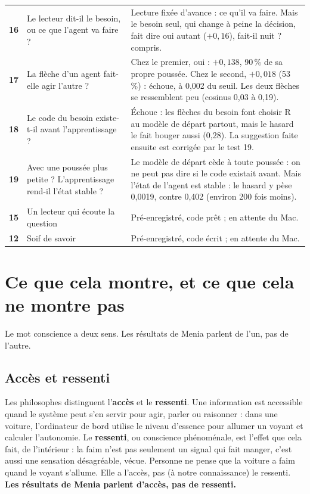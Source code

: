 \documentclass[fontsize=10pt,paper=a4,parskip=half-]{scrartcl}
\newcommand{\lead}[1]{{\fontsize{12}{16.5}\selectfont\color{ink!85!black}#1\par}\vspace{0.3em}}
\newcommand{\q}[1]{\og #1\fg{}}
\newcommand{\pc}{\,\%}
\begin{document}
\begin{center}
\begin{tabularx}{\linewidth}{>{\sffamily\bfseries\color{accent}}c >{\raggedright\arraybackslash}p{4.6cm} >{\raggedright\arraybackslash}X}
16 & Le lecteur dit-il le besoin, ou ce que l'agent va faire ? & Lecture fixée d'avance : \q{ce qu'il va faire}. Mais le besoin seul, qui change à peine la décision, fait dire \q{oui} autant ($+0,16$), \q{fait-il nuit ?} compris.\\
17 & La flèche d'un agent fait-elle agir l'autre ? & Chez le premier, oui : $+0,138$, 90\pc{} de sa propre poussée. Chez le second, $+0,018$ (53\pc) : échoue, à 0,002 du seuil. Les deux flèches se ressemblent peu (cosinus 0,03 à 0,19).\\
18 & Le code du besoin existe-t-il avant l'apprentissage ? & Échoue : les flèches du besoin font choisir R au modèle de départ partout, mais le hasard le fait bouger aussi (0,28). La suggestion faite ensuite est corrigée par le test 19.\\
19 & Avec une poussée plus petite ? L'apprentissage rend-il l'état stable ? & Le modèle de départ cède à toute poussée : on ne peut pas dire si le code existait avant. Mais l'état de l'agent est stable : le hasard y pèse 0,0019, contre 0,402 (environ 200 fois moins).\\
15 & Un lecteur qui écoute la question & Pré-enregistré, code prêt ; en attente du Mac.\\
12 & Soif de savoir & Pré-enregistré, code écrit ; en attente du Mac.\\
\bottomrule
\end{tabularx}
\end{center}

\section{Ce que cela montre, et ce que cela ne montre pas}
\label{sec:portee}

\lead{Le mot \q{conscience} a deux sens. Les résultats de Menia parlent de l'un, pas de
l'autre.}

\subsection{Accès et ressenti}
Les philosophes distinguent l'\textbf{accès} et le \textbf{ressenti}. Une information est
\q{accessible} quand le système peut s'en servir pour agir, parler ou raisonner : dans une
voiture, l'ordinateur de bord utilise le niveau d'essence pour allumer un voyant et
calculer l'autonomie. Le \textbf{ressenti}, ou conscience \q{phénoménale}, est l'effet que
cela fait, de l'intérieur : la faim n'est pas seulement un signal qui fait manger, c'est
aussi une sensation désagréable, vécue. Personne ne pense que la voiture a faim quand le
voyant s'allume. Elle a l'accès, pas (à notre connaissance) le ressenti.
\textbf{Les résultats de Menia parlent d'accès, pas de ressenti.}
\end{document}
